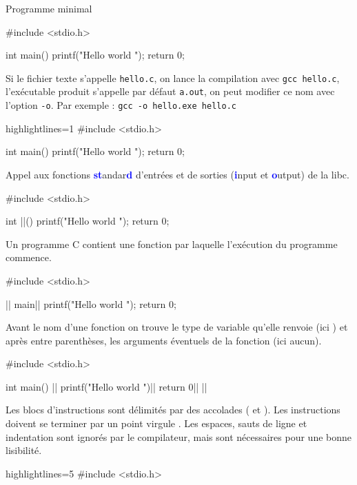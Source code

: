 \documentclass[10pt]{beamer}
\begin{document}
\begin{frame}[fragile]{\Ctitle}{\stitle}
	\begin{exampleblock}{Programme minimal}
		\begin{overprint}
			\begin{langageC}
#include <stdio.h>

int main()
{
	printf("Hello world \n");
	return 0;
}
			\end{langageC}
\medskip
Si le fichier texte s'appelle {\tt hello.c}, on lance la compilation avec {\tt gcc hello.c}, l'exécutable produit s'appelle par défaut {\tt a.out}, on peut modifier ce nom avec l'option {\tt -o}. Par exemple : {\tt gcc -o hello.exe hello.c}
			\onslide<2>
			\begin{langageC*}{highlightlines=1}
#include <stdio.h>

int main()
{
	printf("Hello world \n");
	return 0;
}
			\end{langageC*}
			\medskip
			Appel aux fonctions \textcolor{blue}{\textbf{st}}andar\textcolor{blue}{\textbf d} d'entrées et de sorties (\textcolor{blue}{\textbf i}nput et \textcolor{blue}{\textbf o}utput)  de la libc.
			\onslide<3>
			\begin{langageC}
#include <stdio.h>

int ||()
{
	printf("Hello world \n");
	return 0;
}
			\end{langageC}
			\medskip
			Un programme C contient une fonction  par laquelle l'exécution du programme commence.
			\onslide<4>
			\begin{langageC}
#include <stdio.h>

|| main|\myem{()}|
{
	printf("Hello world \n");
	return 0;
}
			\end{langageC}
			\medskip
			Avant le nom d'une fonction on trouve le type de variable qu'elle renvoie (ici ) et après entre parenthèses, les arguments éventuels de la fonction (ici aucun).
			\onslide<5>
			\begin{langageC}
#include <stdio.h>

int main()
|\myem{\{}|
	printf("Hello world \n")|\myem{;}|
	return 0|\myem{;}|
|\myem{\}}|
			\end{langageC}
			\medskip
			Les blocs d'instructions sont délimités par des accolades (\kw{ \{} et \kw{ \}}). Les instructions doivent se terminer par un point virgule \kw{ ;}. Les espaces, sauts de ligne et indentation sont ignorés par le compilateur, mais sont nécessaires pour une bonne lisibilité.
			\onslide<6>
			\begin{langageC*}{highlightlines=5}
#include <stdio.h>


\end{langageC*}
\end{overprint}
\end{exampleblock}
\end{frame}
\end{document}
